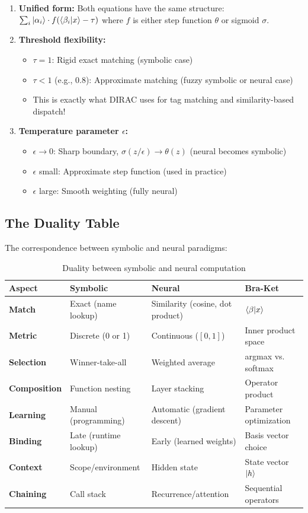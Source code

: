 \documentclass[11pt,a4paper]{article}
\theoremstyle{definition}
\begin{document}
\begin{enumerate}
\item \textbf{Unified form:} Both equations have the same structure: $\sum_i \ket{\alpha_i} \cdot f(\braket{\beta_i|x} - \tau)$ where $f$ is either step function $\theta$ or sigmoid $\sigma$.

\item \textbf{Threshold flexibility:} 
\begin{itemize}
\item $\tau = 1$: Rigid exact matching (symbolic case)
\item $\tau < 1$ (e.g., 0.8): Approximate matching (fuzzy symbolic or neural case)
\item This is exactly what DIRAC uses for tag matching and similarity-based dispatch!
\end{itemize}

\item \textbf{Temperature parameter $\epsilon$:}
\begin{itemize}
\item $\epsilon \to 0$: Sharp boundary, $\sigma(z/\epsilon) \to \theta(z)$ (neural becomes symbolic)
\item $\epsilon$ small: Approximate step function (used in practice)
\item $\epsilon$ large: Smooth weighting (fully neural)
\end{itemize}
\end{enumerate}

\subsection{The Duality Table}

The correspondence between symbolic and neural paradigms:

\begin{table}[h]
\centering
\small
\begin{tabular}{lllp{3cm}}
\toprule
\textbf{Aspect} & \textbf{Symbolic} & \textbf{Neural} & \textbf{Bra-Ket} \\
\midrule
\textbf{Match} & Exact (name lookup) & Similarity (cosine, dot product) & $\braket{\beta|x}$ \\
\textbf{Metric} & Discrete (0 or 1) & Continuous ($[0,1]$) & Inner product space \\
\textbf{Selection} & Winner-take-all & Weighted average & argmax vs. softmax \\
\textbf{Composition} & Function nesting & Layer stacking & Operator product \\
\textbf{Learning} & Manual (programming) & Automatic (gradient descent) & Parameter optimization \\
\textbf{Binding} & Late (runtime lookup) & Early (learned weights) & Basis vector choice \\
\textbf{Context} & Scope/environment & Hidden state & State vector $\ket{h}$ \\
\textbf{Chaining} & Call stack & Recurrence/attention & Sequential operators \\
\bottomrule
\end{tabular}
\caption{Duality between symbolic and neural computation}
\end{table}
\end{document}
